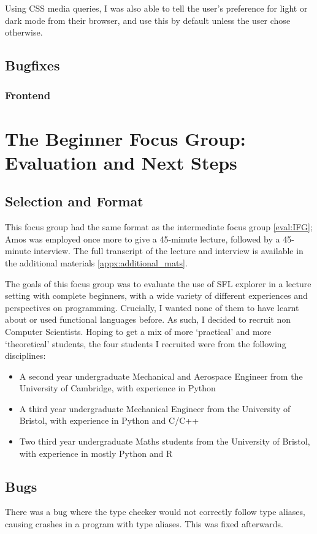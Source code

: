 Using CSS media queries, I was also able to tell the user's preference for light or dark mode from their browser, and use this by default unless the user chose otherwise. 

\subsection{Bugfixes}
\subsubsection{Frontend}

\section{The Beginner Focus Group: Evaluation and Next Steps}
\label{eval:BFG}
\subsection{Selection and Format}
This focus group had the same format as the intermediate focus group \ref{eval:IFG}; Amos was employed once more to give a 45-minute lecture, followed by a 45-minute interview. The full transcript of the lecture and interview is available in the additional materials \ref{appx:additional_mats}.

The goals of this focus group was to evaluate the use of SFL explorer in a lecture setting with complete beginners, with a wide variety of different experiences and perspectives on programming. Crucially, I wanted none of them to have learnt about or used functional languages before. As such, I decided to recruit non Computer Scientists. Hoping to get a mix of more `practical' and more `theoretical' students, the four students I recruited were from the following disciplines:

\begin{itemize}
    \item A second year undergraduate Mechanical and Aerospace Engineer from the University of Cambridge, with experience in Python
    \item A third year undergraduate Mechanical Engineer from the University of Bristol, with experience in Python and C/C++
    \item Two third year undergraduate Maths students from the University of Bristol, with experience in mostly Python and R
\end{itemize}

\subsection{Bugs}
There was a bug where the type checker would not correctly follow type aliases, causing crashes in a program with type aliases. This was fixed afterwards. 

